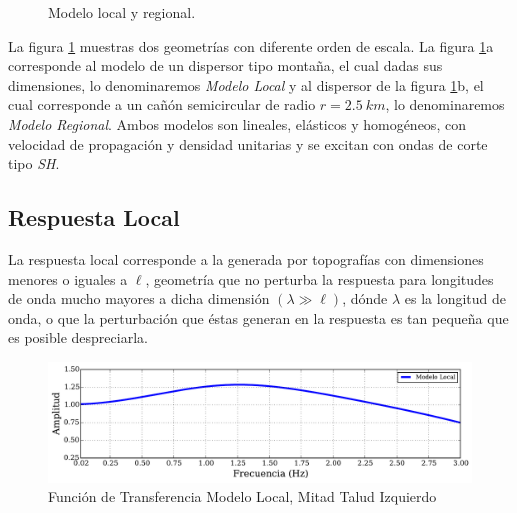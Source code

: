 \documentclass[spanish,letterpaper,12pt,twoside,openany]{article}
\begin{document}
\begin{figure}[H]
	\centering
	\vspace{-.5 cm}
    \caption{Modelo local y regional.}
    \label{fig:modellocalregional}
    \vspace{-1 cm}
\end{figure}

La figura \ref{fig:modellocalregional} muestras dos geometrías con diferente orden de escala. La figura \ref{fig:modellocalregional}a corresponde al modelo de un dispersor tipo montaña, el cual dadas sus dimensiones, lo denominaremos \textit{Modelo Local} y al dispersor de la figura \ref{fig:modellocalregional}b, el cual corresponde a un cañón semicircular de radio $r=2.5\ km$, lo denominaremos \textit{Modelo Regional}. Ambos modelos son lineales, elásticos y homogéneos, con velocidad de propagación y densidad unitarias y se excitan con ondas de corte tipo \textit{SH}.

\subsection{Respuesta Local}

La respuesta local corresponde a la generada por topografías con dimensiones menores o iguales a $\ell$, geometría que no perturba la respuesta para longitudes de onda mucho mayores a dicha dimensión $\left( \lambda \gg \ell \right)$, dónde $\lambda$ es la longitud de onda, o que la perturbación que éstas generan en la respuesta es tan pequeña que es posible despreciarla.

\begin{figure}[H]
	\centering
	\includegraphics[width=15.5 cm]{img/LocalResponse.pdf}
	\vspace{-1 cm}	
	\caption{Función de Transferencia Modelo Local, Mitad Talud Izquierdo}
	\label{fig:localresponse}
	\vspace{-.5 cm}
\end{figure}
\end{document}
